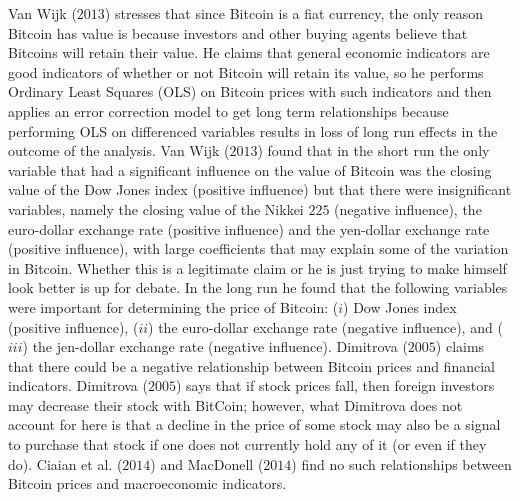 \documentclass{article}[10 pt]
\newcommand{\vs}{\vspace{0.1in}}
\begin{document}
Van Wijk ($2013$) stresses that since Bitcoin is a fiat currency, the only
reason Bitcoin has value is because investors and other buying agents
believe that Bitcoins will retain their value. He claims that general
economic indicators are good indicators of whether or not Bitcoin will
retain its value, so he performs Ordinary Least Squares (OLS) on Bitcoin
prices with such
indicators and then applies an error correction model to get long term
relationships because performing OLS on differenced variables results in
loss of long run effects in the outcome of the analysis. Van Wijk ($2013$) found that
in the short run the only variable that had a significant influence on the
value of Bitcoin was the closing value of the Dow Jones index (positive
influence) but that there were insignificant variables, namely the closing
value of the Nikkei $225$ (negative influence), the euro-dollar exchange
rate (positive influence) and the yen-dollar exchange rate (positive
influence), with large coefficients that may explain some of the variation
in Bitcoin. Whether this is a legitimate claim or he is just trying to make
himself look better is up for debate. In the long run he found that the
following variables were important for determining the price of Bitcoin:
($i$) Dow Jones index (positive influence), ($ii$) the euro-dollar exchange
rate (negative influence), and ($iii$) the jen-dollar exchange rate
(negative influence). Dimitrova ($2005$) claims that there could be a
negative relationship between Bitcoin prices and financial indicators.
Dimitrova ($2005$) says that if stock prices fall, then foreign investors
may decrease their stock with BitCoin; however, what Dimitrova does not
account for here is that a decline in the price of some stock may also be a
signal to purchase that stock if one does not currently hold any of it (or
even if they do). Ciaian et al. ($2014$) and MacDonell ($2014$) find no such
relationships between Bitcoin prices and macroeconomic indicators.

\vs
\end{document}

